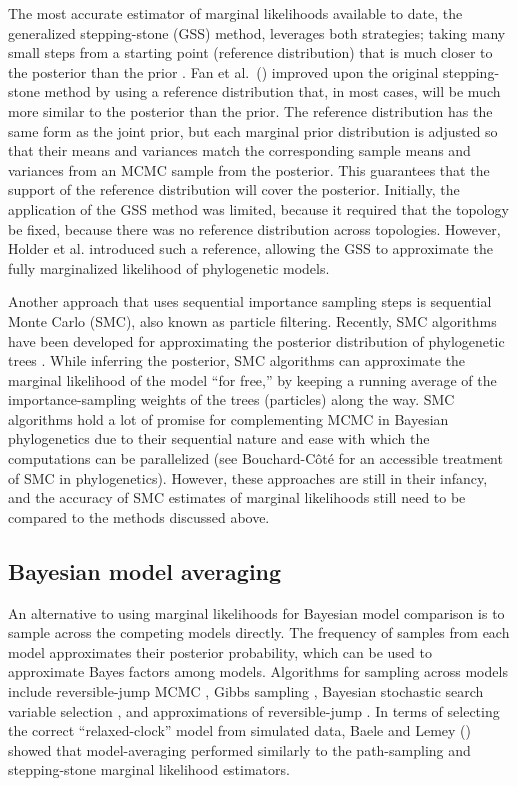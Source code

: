 The most accurate estimator of marginal likelihoods available to date, the
generalized stepping-stone (GSS) method, leverages both strategies; taking many
small steps from a starting point (reference distribution) that is much closer
to the posterior than the prior \citep{Fan2011}.
Fan et al.\ (\citeyear{Fan2011}) improved upon the original stepping-stone
method by using a reference distribution that, in most cases, will be much more
similar to the posterior than the prior.
The reference distribution has the same form as the joint prior,
but each marginal prior
distribution is adjusted so that their means and variances match the
corresponding sample means and variances from an MCMC sample from the
posterior.
This guarantees that the support of the reference distribution will cover the
posterior.
Initially, the application of the GSS method was limited, because it required
that the topology be fixed, because there was no reference distribution across
topologies.
However, Holder et al. \citeyear{Holder2014} introduced such a reference,
allowing the GSS to approximate the fully marginalized likelihood of
phylogenetic models.

Another approach that uses sequential importance sampling steps is sequential
Monte Carlo (SMC), also known as particle filtering.
Recently, SMC algorithms have been developed for approximating the posterior
distribution of phylogenetic trees \citep{Jordan2012,Bouchard2014}.
While inferring the posterior, SMC algorithms can approximate the marginal
likelihood of the model ``for free,'' by keeping a running average of the
importance-sampling weights of the trees (particles) along the way.
SMC algorithms hold a lot of promise for complementing MCMC in Bayesian
phylogenetics due to their sequential nature and ease with which the
computations can be parallelized (see Bouchard-C\^{o}t\'{e}
\citeyear{Bouchard2014} for an accessible treatment of SMC in phylogenetics).
However, these approaches are still in their infancy, and the accuracy of SMC
estimates of marginal likelihoods still need to be compared to the methods
discussed above.

\subsection{Bayesian model averaging}

An alternative to using marginal likelihoods for Bayesian model comparison is
to sample across the competing models directly.
The frequency of samples from each model approximates their posterior
probability, which can be used to approximate Bayes factors among models.
Algorithms for sampling across models include reversible-jump MCMC
\citep{Green1995}, Gibbs sampling \citep{Neal2000}, Bayesian stochastic search
variable selection \citep{George1993,Kuo1998}, and approximations of reversible-jump
\citep{Jones2015}.
In terms of selecting the correct ``relaxed-clock'' model from simulated data,
Baele and Lemey (\citeyear{Baele2014}) showed that model-averaging performed
similarly to the path-sampling and stepping-stone marginal likelihood
estimators.

